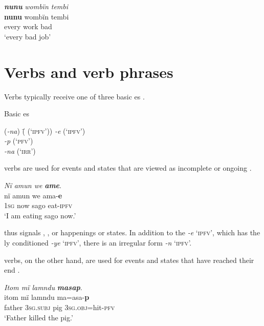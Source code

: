 \ea%
    \label{ex:overview:21}
    \textbf{\textit{nunu}} \textit{wombïn tembi}\\
\gll    \textbf{nunu}  wombïn  tembi\\
    every  work    bad\\
\glt    ‘every bad job’
\z

\section{Verbs and verb phrases}\label{sec:overview:2.4}


Verbs typically receive one of three basic  es .

\ea%
    \label{ex:overview:22}
Basic  es\\
\begin{tabbing}
{(\textit{-na})} \= {( (‘\textsc{ipfv}’))}\kill
{\textit{-e}} \> { (‘\textsc{ipfv}’)}\\
{\textit{-p}} \> { (‘\textsc{pfv}’)}\\
{\textit{-na}} \> { (‘\textsc{irr}’)}
\end{tabbing}
\z

 verbs are used for events and states that are viewed as incomplete or ongoing .

\ea%
    \label{ex:overview:23}
    \textit{Nï amun we} \textbf{\textit{ame}}.\\
\gll    nï    amun  we    ama-\textbf{e}\\
    1\textsc{sg}  now  sago  eat-\textsc{ipfv}\\
\glt    ‘I am eating sago now.’
\z

  thus signals , , or  happenings or states. In addition to the   \textit{{}-e} ‘\textsc{ipfv}’, which has the ly conditioned  \textit{{}-ye} ‘\textsc{ipfv}’, there is an irregular  form \textit{{}-n} ‘\textsc{ipfv}’.

 verbs, on the other hand, are used for events and states that have reached their end .

\ea%
    \label{ex:overview:24}
    \textit{Itom mï lamndu} \textbf{\textit{masap}}.\\
\gll    itom  mï      lamndu  ma=asa-\textbf{p}\\
    father  3\textsc{sg.subj}  pig      3\textsc{sg.obj}=hit-\textsc{pfv}\\
\glt    ‘Father killed the pig.’
\z

